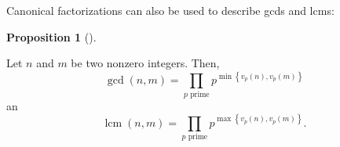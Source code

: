 \documentclass[numbers=enddot,12pt,final,onecolumn,notitlepage]{scrartcl}%
\numberwithin{exer}{subsection}
\theoremstyle{definition}
\newtheorem{prop}[theo]{Proposition}
\newenvironment{proposition}[1][]
{\begin{prop}[#1]\begin{leftbar}}
{\end{leftbar}\end{prop}}
\let\prodnonlimits\prod
\renewcommand{\prod}{\prodnonlimits\limits}
\begin{document}
Canonical factorizations can also be used to describe gcds and lcms:

\begin{proposition}
\label{prop.ent.primes.gcd}Let $n$ and $m$ be two nonzero integers. Then,%
\begin{equation}
\gcd\left(  n,m\right)  =\prod_{p\text{ prime}}p^{\min\left\{  v_{p}\left(
n\right)  ,v_{p}\left(  m\right)  \right\}  }
\label{eq.prop.ent.primes.gcd.gcd}%
\end{equation}
an%
\begin{equation}
\operatorname{lcm}\left(  n,m\right)  =\prod_{p\text{ prime}}p^{\max\left\{
v_{p}\left(  n\right)  ,v_{p}\left(  m\right)  \right\}  }.
\label{eq.prop.ent.primes.gcd.lcm}%
\end{equation}

\end{proposition}
\end{document}
